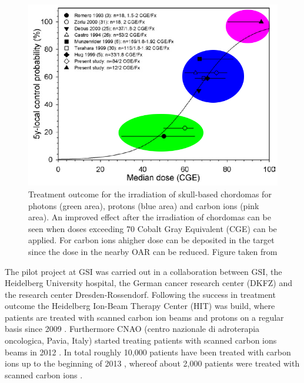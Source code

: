 \begin{figure}[H]
\begin{center}
\includegraphics[scale=0.35]{./teile/introduction/chordoma_farben.png}
\caption{Treatment outcome for the irradiation of skull-based chordomas for photons (green area), protons (blue area) and carbon ions (pink 
area). An improved effect after the irradiation of chordomas can be seen when doses exceeding 70 Cobalt Gray Equivalent (CGE) can 
be applied. For carbon ions ahigher dose can be deposited in the target since the dose in the nearby OAR can be reduced. Figure taken 
from \cite{Schu07}}
\label{chordoma}
\end{center}
\end{figure}

The pilot project at GSI was carried out in a collaboration between GSI, the Heidelberg University hospital, the German cancer research 
center (DKFZ) and the research center Dresden-Rossendorf. Following the success in treatment outcome \cite{Loe13} the Heidelberg Ion-Beam Therapy 
Center (HIT) was build, where patients are treated with scanned carbon ion beams and protons on a regular basis since 2009 \cite{Com10}. 
Furthermore CNAO (centro nazionale di adroterapia oncologica, Pavia, Italy) \cite{Ama04} started treating patients with scanned carbon ions 
beams in 2012 \cite{PTCOG13}. In total roughly 10,000 patients have been treated with carbon ions up to the beginning of 2013 \cite{Loe13}, 
whereof about 2,000 patients were treated with scanned carbon ions \cite{PTCOG13}.


